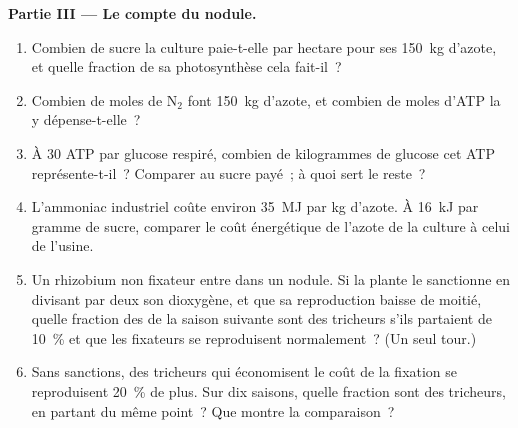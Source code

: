 \begin{problem}
\medskip
\noindent\textbf{Partie III --- Le compte du nodule.}
\begin{enumerate}[resume]
  \item Combien de sucre la culture paie-t-elle par hectare pour ses
        \qty{150}{kg} d'azote, et quelle fraction de sa photosynthèse
        cela fait-il~?
  \item Combien de moles de N$_{2}$ font \qty{150}{kg} d'azote, et
        combien de moles d'ATP la  y dépense-t-elle~?
  \item À $30$ ATP par glucose respiré, combien de kilogrammes de
        glucose cet ATP représente-t-il~? Comparer au sucre payé~; à
        quoi sert le reste~?
  \item L'ammoniac industriel coûte environ \qty{35}{MJ} par kg
        d'azote. À \qty{16}{kJ} par gramme de sucre, comparer le coût
        énergétique de l'azote de la culture à celui de l'usine.
  \item Un rhizobium non fixateur entre dans un nodule. Si la plante le
        sanctionne en divisant par deux son dioxygène, et que sa
        reproduction baisse de moitié, quelle fraction des 
        de la saison suivante sont des tricheurs s'ils partaient de
        \qty{10}{\%} et que les fixateurs se reproduisent normalement~?
        (Un seul tour.)
  \item Sans sanctions, des tricheurs qui économisent le coût de la
        fixation se reproduisent \qty{20}{\%} de plus. Sur dix saisons,
        quelle fraction sont des tricheurs, en partant du même point~?
        Que montre la comparaison~?
\end{enumerate}


\end{problem}
